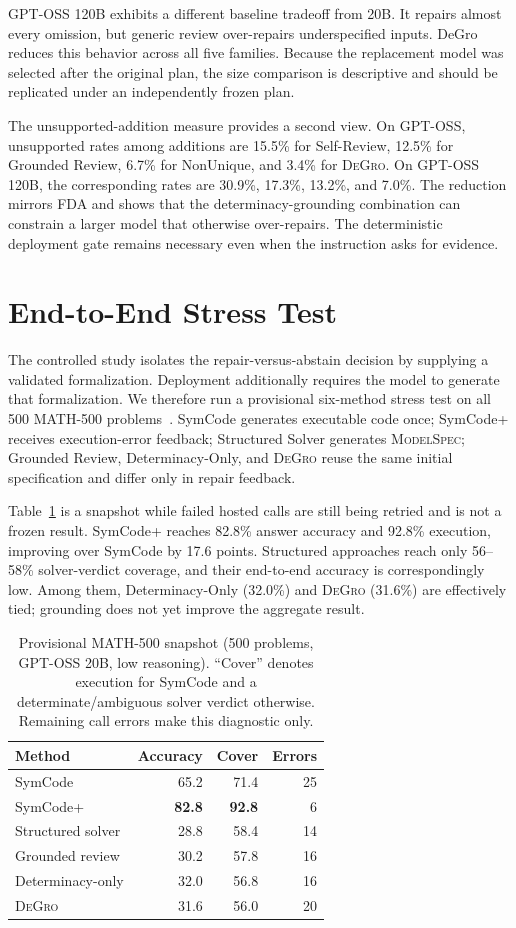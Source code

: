 \documentclass[sigconf,anonymous]{aamas}
\newcommand{\method}{\textsc{DeGro}}
\begin{document}
GPT-OSS 120B exhibits a different baseline tradeoff from 20B.  It repairs almost every omission, but generic review over-repairs underspecified inputs.  DeGro reduces this behavior across all five families.  Because the replacement model was selected after the original plan, the size comparison is descriptive and should be replicated under an independently frozen plan.

The unsupported-addition measure provides a second view.  On GPT-OSS, unsupported rates among additions are 15.5\% for Self-Review, 12.5\% for Grounded Review, 6.7\% for NonUnique, and 3.4\% for \method.  On GPT-OSS 120B, the corresponding rates are 30.9\%, 17.3\%, 13.2\%, and 7.0\%.  The reduction mirrors FDA and shows that the determinacy-grounding combination can constrain a larger model that otherwise over-repairs.  The deterministic deployment gate remains necessary even when the instruction asks for evidence.

\section{End-to-End Stress Test}
The controlled study isolates the repair-versus-abstain decision by supplying a validated formalization.  Deployment additionally requires the model to generate that formalization.  We therefore run a provisional six-method stress test on all 500 MATH-500 problems~\cite{hendrycks2021math}.  SymCode generates executable code once; SymCode+ receives execution-error feedback; Structured Solver generates \textsc{ModelSpec}; Grounded Review, Determinacy-Only, and \method{} reuse the same initial specification and differ only in repair feedback.

Table~\ref{tab:math500} is a snapshot while failed hosted calls are still being retried and is not a frozen result.  SymCode+ reaches 82.8\% answer accuracy and 92.8\% execution, improving over SymCode by 17.6 points.  Structured approaches reach only 56--58\% solver-verdict coverage, and their end-to-end accuracy is correspondingly low.  Among them, Determinacy-Only (32.0\%) and \method{} (31.6\%) are effectively tied; grounding does not yet improve the aggregate result.

\begin{table}[t]
\centering
\caption{Provisional MATH-500 snapshot (500 problems, GPT-OSS 20B, low reasoning).  ``Cover'' denotes execution for SymCode and a determinate/ambiguous solver verdict otherwise.  Remaining call errors make this diagnostic only.}
\label{tab:math500}
\small
\begin{tabular}{lrrr}
\toprule
Method & Accuracy & Cover & Errors\\
\midrule
SymCode & 65.2 & 71.4 & 25\\
SymCode+ & \textbf{82.8} & \textbf{92.8} & 6\\
Structured solver & 28.8 & 58.4 & 14\\
Grounded review & 30.2 & 57.8 & 16\\
Determinacy-only & 32.0 & 56.8 & 16\\
\method & 31.6 & 56.0 & 20\\
\bottomrule
\end{tabular}
\end{table}
\end{document}
